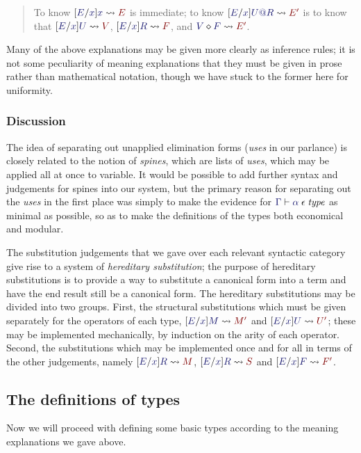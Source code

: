 \documentclass[main.tex]{subfiles}
\begin{document}
\begin{quote}
  To know $\hsubstrm{E}{x}{x}{E}$ is immediate; to know
$\hsubstrm{E}{x}{\elim{U}{R}}{E'}$ is to know that
$\hsubstu{E}{x}{U}{V}$, $\hsubstrm{E}{x}{R}{F}$, and $\eapply{V}{F}{E'}$.
\end{quote}\medskip

Many of the above explanations may be given more clearly as inference
rules; it is not some peculiarity of meaning explanations that they
must be given in prose rather than mathematical notation, though we
have stuck to the former here for uniformity.

\subsubsection{Discussion}

The idea of separating out unapplied elimination forms (\emph{uses} in
our parlance) is closely related to the notion of \emph{spines}, which
are lists of \emph{uses}, which may be applied all at once to
variable. It would be possible to add further syntax and judgements
for spines into our system, but the primary reason for separating out
the \emph{uses} in the first place was simply to make the evidence for
$\lfsequent\Gamma\cantype{\alpha}$ as minimal as possible, so as to make the
definitions of the types both economical and modular.

The substitution judgements that we gave over each relevant syntactic
category give rise to a system of \emph{hereditary substitution}; the
purpose of hereditary substitutions is to provide a way to substitute
a canonical form into a term and have the end result still be a
canonical form. The hereditary substitutions may be divided into two
groups. First, the structural substitutions which must be given
separately for the operators of each type, $\hsubstm{E}{x}{M}{M'}$ and
$\hsubstr{E}{x}{U}{U'}$; these may be implemented mechanically, by
induction on the arity of each operator. Second, the substitutions
which may be implemented once and for all in terms of the other
judgements, namely $\hsubstrm{E}{x}{R}{M}$, $\hsubstr{E}{x}{R}{S}$ and
$\hsubste{E}{x}{F}{F'}$.

\subsection{The definitions of types}

Now we will proceed with defining some basic types according to the
meaning explanations we gave above.
\end{document}
